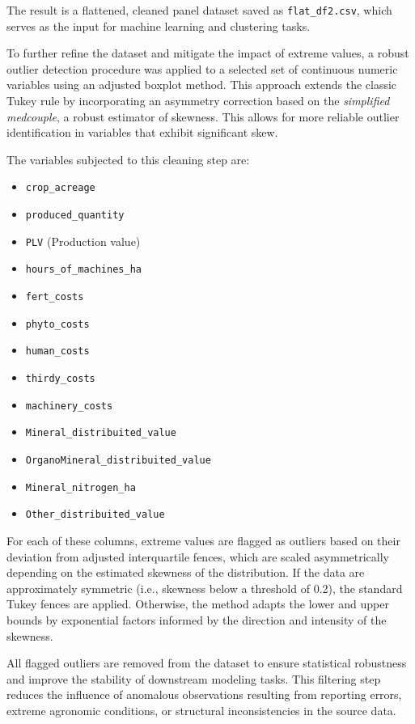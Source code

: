 \documentclass[a4paper,12pt]{article}
\begin{document}
The result is a flattened, cleaned panel dataset saved as \texttt{flat\_df2.csv}, which serves as the input for machine learning and clustering tasks.

To further refine the dataset and mitigate the impact of extreme values, a robust outlier detection procedure was applied to a selected set of continuous numeric variables using an adjusted boxplot method. This approach extends the classic Tukey rule by incorporating an asymmetry correction based on the \textit{simplified medcouple}, a robust estimator of skewness. This allows for more reliable outlier identification in variables that exhibit significant skew.

The variables subjected to this cleaning step are:

\begin{itemize}
    \item \texttt{crop\_acreage}
    \item \texttt{produced\_quantity}
    \item \texttt{PLV} (Production value)
    \item \texttt{hours\_of\_machines\_ha}
    \item \texttt{fert\_costs}
    \item \texttt{phyto\_costs}
    \item \texttt{human\_costs}
    \item \texttt{thirdy\_costs}
    \item \texttt{machinery\_costs}
    \item \texttt{Mineral\_distribuited\_value}
    \item \texttt{OrganoMineral\_distribuited\_value}
    \item \texttt{Mineral\_nitrogen\_ha}
    \item \texttt{Other\_distribuited\_value}
\end{itemize}

For each of these columns, extreme values are flagged as outliers based on their deviation from adjusted interquartile fences, which are scaled asymmetrically depending on the estimated skewness of the distribution. If the data are approximately symmetric (i.e., skewness below a threshold of 0.2), the standard Tukey fences are applied. Otherwise, the method adapts the lower and upper bounds by exponential factors informed by the direction and intensity of the skewness.

All flagged outliers are removed from the dataset to ensure statistical robustness and improve the stability of downstream modeling tasks. This filtering step reduces the influence of anomalous observations resulting from reporting errors, extreme agronomic conditions, or structural inconsistencies in the source data.
\end{document}
